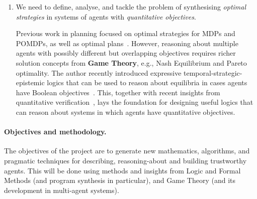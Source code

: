 \documentclass[a4paper,12pt,smallheadings]{scrartcl}
\newcommand\aside[1]{\textcolor{red}{#1}}
\begin{document}
\begin{enumerate}

 
 \item We need to define, analyse, and tackle the problem of synthesising \emph{optimal strategies} in systems of agents with \emph{quantitative objectives}.
 
 Previous work in planning focused on optimal strategies for MDPs and POMDPs, as well as optimal plans~\cite{GeffnerBo13,Penna15,TorralbaAKE17}.
 However, reasoning about multiple agents with possibly different but overlapping objectives requires richer solution concepts from \textbf{Game Theory}, e.g., Nash Equilibrium and Pareto optimality. The author recently introduced expressive temporal-strategic-epistemic logics that can be used to reason about equilibria in cases agents have Boolean objectives~. This, together with recent insights from quantitative verification~\cite{DBLP:journals/jacm/AlmagorBK16}, lays the foundation for designing useful logics that can reason about systems in which agents have {quantitative objectives}.
 
 
 
\end{enumerate}


\paragraph{Objectives and methodology.}
The objectives of the project are to generate new mathematics, algorithms, and pragmatic techniques for describing, reasoning-about and building trustworthy  agents. This will be done using methods and insights from Logic and Formal Methods (and program synthesis in particular), and 
Game Theory (and its development in multi-agent systems). 
\end{document}
